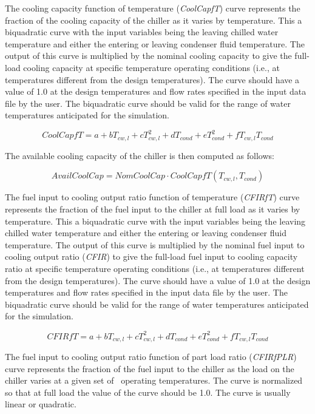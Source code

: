The cooling capacity function of temperature (\emph{CoolCapfT}) curve represents the fraction of the cooling capacity of the chiller as it varies by temperature. This a biquadratic curve with the input variables being the leaving chilled water temperature and either the entering or leaving condenser fluid temperature. The output of this curve is multiplied by the nominal cooling capacity to give the full-load cooling capacity at specific temperature operating conditions (i.e., at temperatures different from the design temperatures). The curve should have a value of 1.0 at the design temperatures and flow rates specified in the input data file by the user. The biquadratic curve should be valid for the range of water temperatures anticipated for the simulation.

\begin{equation}
CoolCapfT = a + b{T_{cw,l}} + cT_{cw,l}^2 + d{T_{cond}} + eT_{cond}^2 + f{T_{cw,l}}{T_{cond}}
\end{equation}

The available cooling capacity of the chiller is then computed as follows:

\begin{equation}
AvailCoolCap = NomCoolCap \cdot CoolCapfT({T_{cw,l}},{T_{cond}})
\end{equation}

The fuel input to cooling output ratio function of temperature (\emph{CFIRfT}) curve represents the fraction of the fuel input to the chiller at full load as it varies by temperature. This a biquadratic curve with the input variables being the leaving chilled water temperature and either the entering or leaving condenser fluid temperature. The output of this curve is multiplied by the nominal fuel input to cooling output ratio (\emph{CFIR}) to give the full-load fuel input to cooling capacity ratio at specific temperature operating conditions (i.e., at temperatures different from the design temperatures). The curve should have a value of 1.0 at the design temperatures and flow rates specified in the input data file by the user. The biquadratic curve should be valid for the range of water temperatures anticipated for the simulation.

\begin{equation}
CFIRfT = a + b{T_{cw,l}} + cT_{cw,l}^2 + d{T_{cond}} + eT_{cond}^2 + f{T_{cw,l}}{T_{cond}}
\end{equation}

The fuel input to cooling output ratio function of part load ratio (\emph{CFIRfPLR}) curve represents the fraction of the fuel input to the chiller as the load on the chiller varies at a given set of~ operating temperatures. The curve is normalized so that at full load the value of the curve should be 1.0. The curve is usually linear or quadratic.

